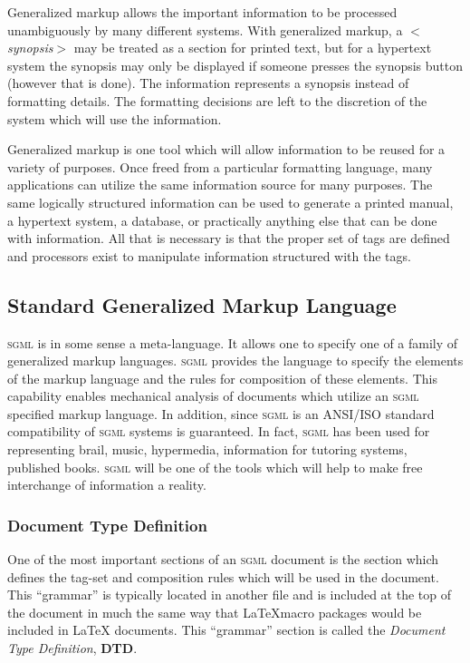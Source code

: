 Generalized markup allows the important information to be processed
unambiguously by many different systems. With generalized markup,
a \textit{$<$synopsis$>$} may be treated as a section for printed text, but
for a hypertext system the synopsis may only be displayed if someone
presses the synopsis button (however that is done). The information
represents a synopsis instead of formatting details. The formatting
decisions are left to the discretion of the system which will use the 
information. 

Generalized markup is one tool which will allow information to be
reused for a variety of purposes. Once freed from a particular
formatting language, many applications can utilize the same information
source for many purposes. The same logically structured information can
be used to generate a printed manual, a hypertext system, a database,
or practically anything else that can be done with information.
All that is necessary is that the proper set of tags are defined and
processors exist to manipulate information structured with the tags.

\subsection{Standard Generalized Markup Language}

\textsc{sgml} is in some sense a meta-language. It allows one to specify 
one of a family of generalized markup languages. \textsc{sgml} provides the
language to specify the elements of the markup language and the rules
for composition of these elements. This capability enables mechanical
analysis of documents which utilize an \textsc{sgml} specified markup language. 
In addition, since \textsc{sgml} is an ANSI/ISO standard compatibility of 
\textsc{sgml} systems is guaranteed. In fact, \textsc{sgml} has been used for 
representing brail, music, hypermedia, information for tutoring systems, 
published books. \textsc{sgml} will be one of the tools which will help to make 
free interchange of information a reality.

\subsubsection{Document Type Definition}
One of the most important sections of an \textsc{sgml} document is the 
section which defines the tag-set and composition rules which will 
be used in the document. This ``grammar'' is typically located in 
another file and is included at the top of the document in much the
same way that \LaTeX macro packages would be included in \LaTeX 
documents. This ``grammar'' section is called the \emph{Document Type
Definition}, \textbf{DTD}.

